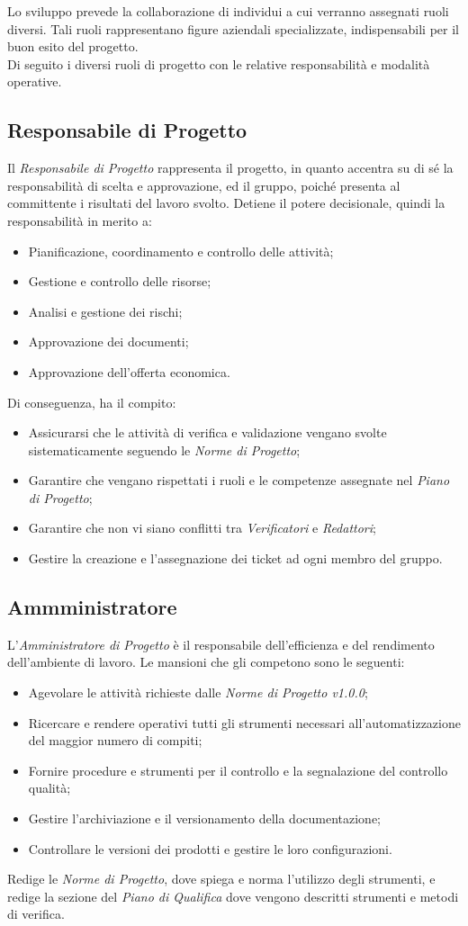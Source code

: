 Lo sviluppo prevede la collaborazione di individui a cui verranno assegnati ruoli diversi. Tali ruoli rappresentano figure aziendali specializzate, indispensabili per il buon esito del progetto.\\
Di seguito i diversi ruoli di progetto con le relative responsabilità e modalità operative.
\subsection{Responsabile di Progetto}
Il \textit{Responsabile di Progetto} rappresenta il progetto, in quanto accentra su di sé la responsabilità di scelta e approvazione, ed il gruppo, poiché presenta al committente i risultati del lavoro svolto.
Detiene il potere decisionale, quindi la responsabilità in merito a:
\begin{itemize}
	\item Pianificazione, coordinamento e controllo delle attività;
	\item Gestione e controllo delle risorse;
	\item Analisi e gestione dei rischi;
	\item Approvazione dei documenti;
	\item Approvazione dell'offerta economica.
\end{itemize}
Di conseguenza, ha il compito:
\begin{itemize}
	\item Assicurarsi che le attività di verifica e validazione vengano svolte sistematicamente seguendo le \textit{Norme di Progetto};
	\item Garantire che vengano rispettati i ruoli e le competenze assegnate nel \textit{Piano di Progetto};
	\item Garantire che non vi siano conflitti tra \textit{Verificatori} e \textit{Redattori};
	\item Gestire la creazione e l'assegnazione dei \gls{ticket} ad ogni membro del gruppo.
\end{itemize}
\subsection{Ammministratore}
L'\textit{Amministratore di Progetto} è il responsabile dell'efficienza e del rendimento dell'ambiente di lavoro. Le mansioni che gli competono sono le seguenti:
\begin{itemize}
	\item Agevolare le attività richieste dalle \textit{Norme di Progetto v1.0.0};
	\item Ricercare e rendere operativi tutti gli strumenti necessari all'automatizzazione del maggior numero di compiti;
	\item Fornire procedure e strumenti per il controllo e la segnalazione del controllo qualità;
	\item Gestire l'archiviazione e il \gls{versionamento} della documentazione;
	\item Controllare le versioni dei prodotti e gestire le loro configurazioni.
\end{itemize}
Redige le \textit{Norme di Progetto}, dove spiega e norma l'utilizzo degli strumenti, e redige la sezione del \textit{Piano di Qualifica} dove vengono descritti strumenti e metodi di verifica.
